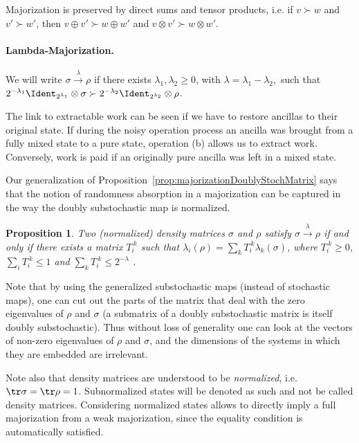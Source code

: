 \documentclass[11pt,a4paper]{article}
\theoremstyle{plain}
\newtheorem{prop}[thm]{Proposition}
\newcommand{\lambdamaj}[1]{\xrightarrow{#1}}
\begin{document}
Majorization is preserved by direct sums and tensor products, i.e. if $v\succ w$ and $v'\succ w'$, then
$v\oplus v' \succ w\oplus w'$ and $v\otimes v' \succ w\otimes w'$.

\paragraph{Lambda-Majorization.} We will write $\sigma\lambdamaj{\lambda}\rho$ if there exists
$\lambda_1,\lambda_2\geqslant 0$, with $\lambda=\lambda_1-\lambda_2,$ such
that $2^{-\lambda_1}\Ident_{2^{\lambda_1}}\otimes\sigma \succ 2^{-\lambda_2}\Ident_{2^{\lambda_2}}\otimes\rho$.

The link to extractable work can be seen if we have to restore ancillas to their original state. If during
the noisy operation process an ancilla was brought from a fully mixed state to a pure state, operation (b)
allows us to extract work. Conversely, work is paid if an originally pure ancilla was left in a mixed
state.

Our generalization of Proposition~\ref{prop:majorizationDoublyStochMatrix} says that the notion of
randomness absorption in a majorization can be captured in
the way the doubly substochastic map is normalized.
\begin{prop}
  \label{prop:LambdaMajTik}
  Two (normalized) density matrices $\sigma$ and $\rho$ satisfy $\sigma\lambdamaj{\lambda}\rho$
  if and only if there exists a matrix $T_i^{~k}$ such that $\lambda_i(\rho) = \sum_k T_i^{~k}\lambda_k(\sigma)$,
  where $T_i^{~k}\geqslant 0$, $\sum_i T_i^{~k} \leqslant 1$ and $\sum_k T_i^{~k} \leqslant 2^{-\lambda}$ .
\end{prop}

Note that by using the generalized substochastic maps (instead of stochastic maps), one can cut out the parts
of the matrix that deal with the zero eigenvalues of $\rho$ and $\sigma$ (a submatrix of a doubly substochastic
matrix is itself doubly substochastic). Thus without loss of generality one can look at the vectors of
non-zero eigenvalues of $\rho$ and $\sigma$, and the dimensions of the systems in which they are embedded are
irrelevant.

Note also that density matrices are understood to be {\em normalized}, i.e. $\tr\sigma=\tr\rho=1$. Subnormalized
states will be denoted as such and not be called density matrices. Considering normalized states allows to
directly imply a full majorization from a weak majorization, since the equality condition is automatically
satisfied.
\end{document}
